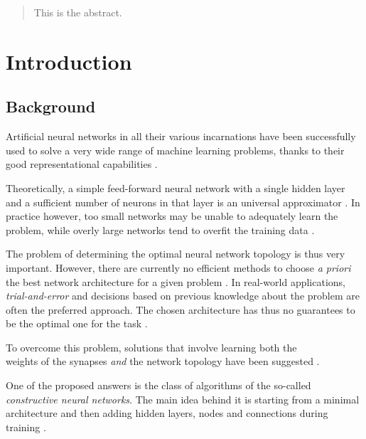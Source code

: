 \documentclass[11pt,a4paper]{report}
\begin{document}
	
	
	
	\begin{abstract}
		This is the abstract.
	\end{abstract}
	
	
	\tableofcontents

	\printnomenclature
	\listoffigures
	\listoftables
	
	
	\chapter{Introduction}
		\section{Background}
		Artificial neural networks in all their various incarnations have been successfully used to solve a very wide range of machine learning problems, thanks to their good representational capabilities \cite{sharma2010constructive}.
		
		Theoretically, a simple feed-forward neural network with a single hidden layer and a sufficient number of neurons in that layer is an universal approximator \cite{hornik1989multilayer,kuurkova1992kolmogorov}. In practice however, too small networks may be unable to adequately learn the problem, while overly large networks tend to overfit the training data \cite{parekh2000constructive}.
		
		The problem of determining the optimal neural network topology is thus very important. However, there are currently no efficient methods to choose \emph{a priori} the best network architecture for a given problem \cite{parekh2000constructive}. In real-world applications, \emph{trial-and-error} and decisions based on previous knowledge about the problem are often the preferred approach. The chosen architecture has thus no guarantees to be the optimal one for the task \cite{sharma2010constructive}.
		
		To overcome this problem, solutions that involve learning both the\\weights of the synapses \emph{and} the network topology have been suggested \cite{parekh2000constructive}.
		
		One of the proposed answers is the class of algorithms of the so-called \emph{constructive neural networks}. The main idea behind it is starting from a minimal architecture and then adding hidden layers, nodes and connections during training \cite{kotsiantis2007supervised,sharma2010constructive}.
		
\end{document}
